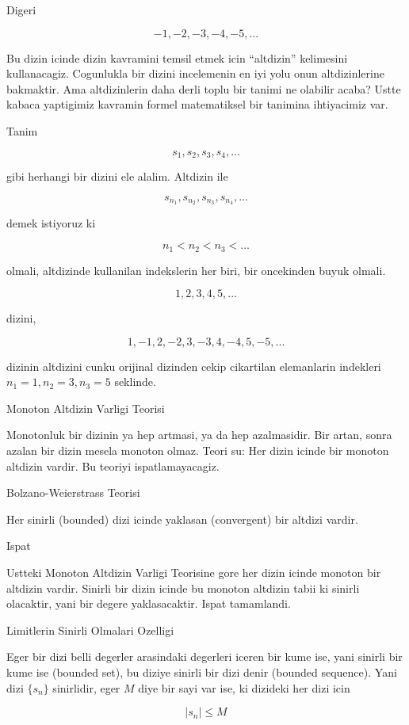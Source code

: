 \documentclass[12pt,fleqn]{article}
\begin{document}
Digeri 

\[ -1, -2, -3, -4, -5, ... \]

Bu dizin icinde dizin kavramini temsil etmek icin ``altdizin'' kelimesini
kullanacagiz. Cogunlukla bir dizini incelemenin en iyi yolu onun
altdizinlerine bakmaktir. Ama altdizinlerin daha derli toplu bir tanimi ne
olabilir acaba? Ustte kabaca yaptigimiz kavramin formel matematiksel bir
tanimina ihtiyacimiz var. 

Tanim

\[ s_1, s_2,s_3,s_4,...\]

gibi herhangi bir dizini ele alalim. Altdizin ile 

\[ s_{n_1},s_{n_2},s_{n_3},s_{n_4},... \]

demek istiyoruz ki

\[ n_1 < n_2 < n_3 < ... \]

olmali, altdizinde kullanilan indekslerin her biri, bir oncekinden buyuk
olmali. 

\[ 1, 2, 3, 4, 5, ... \]

dizini, 

\[ 1, -1, 2, -2, 3, -3, 4, -4, 5, -5, . . . \]

dizinin altdizini cunku orijinal dizinden cekip cikartilan elemanlarin
indekleri $n_1=1,n_2 = 3,n_3 = 5$ seklinde. 

Monoton Altdizin Varligi Teorisi

Monotonluk bir dizinin ya hep artmasi, ya da hep azalmasidir. Bir artan,
sonra azalan bir dizin mesela monoton olmaz. Teori su: Her dizin icinde
bir monoton altdizin vardir. Bu teoriyi ispatlamayacagiz. 

Bolzano-Weierstrass Teorisi 

Her sinirli (bounded) dizi icinde yaklasan (convergent) bir altdizi
vardir. 

Ispat

Ustteki Monoton Altdizin Varligi Teorisine gore her dizin icinde
monoton bir altdizin vardir. Sinirli bir dizin icinde bu monoton altdizin
tabii ki sinirli olacaktir, yani bir degere yaklasacaktir. Ispat
tamamlandi. 

Limitlerin Sinirli Olmalari Ozelligi 

Eger bir dizi belli degerler arasindaki degerleri iceren bir kume ise, yani
sinirli bir kume ise (bounded set), bu diziye sinirli bir dizi denir
(bounded sequence). Yani dizi $\{s_n\}$ sinirlidir, eger $M$ diye bir sayi
var ise, ki dizideki her dizi icin 

\[ |s_n| \le M \]
\end{document}
